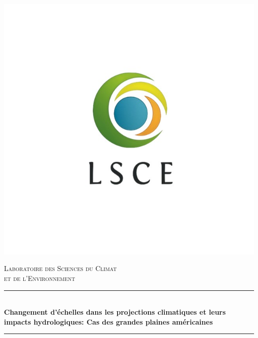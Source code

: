 \documentclass[a4paper,11pt]{article}
\begin{document}
	\begin{center}
			\includegraphics[scale=0.5]{images/LSCE.jpg}
	\end{center}
	\hypersetup{pdfborder=0 0 0}
	\newcommand{\HRule}{\rule{\linewidth}{0.5mm}}
	\begin{center}
		\textsc{\LARGE Laboratoire des Sciences du Climat} \\[0.3cm]
		\textsc{\LARGE et de l'Environnement}\\[1.5cm] 
		\HRule \\[0.5cm]
		{\huge \bfseries Changement d’échelles dans les projections climatiques et leurs impacts hydrologiques: Cas des grandes plaines américaines}\\[0.4cm] 
		\HRule \\[1.5cm]
	\end{center}
	
\end{document}
